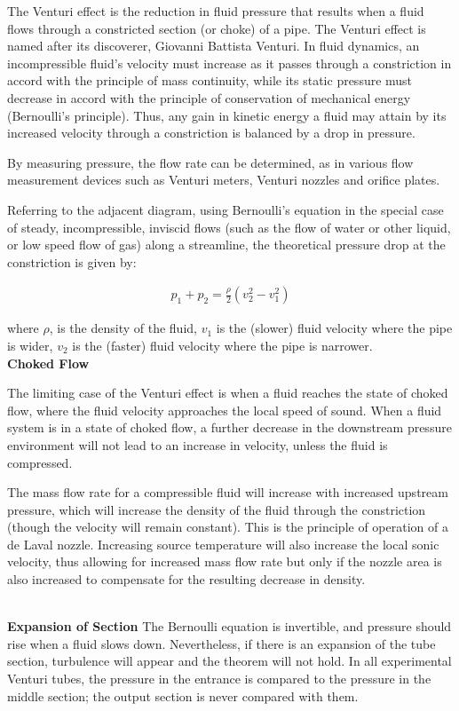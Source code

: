 \begin{phybox}{}
    {The Venturi effect is the reduction in fluid pressure that results when a fluid flows through a constricted section (or choke) of a pipe. The Venturi effect is named after its discoverer, Giovanni Battista Venturi. In fluid dynamics, an incompressible fluid's velocity must increase as it passes through a constriction in accord with the principle of mass continuity, while its static pressure must decrease in accord with the principle of conservation of mechanical energy (Bernoulli's principle). Thus, any gain in kinetic energy a fluid may attain by its increased velocity through a constriction is balanced by a drop in pressure.

    By measuring pressure, the flow rate can be determined, as in various flow measurement devices such as Venturi meters, Venturi nozzles and orifice plates.
    
    Referring to the adjacent diagram, using Bernoulli's equation in the special case of steady, incompressible, inviscid flows (such as the flow of water or other liquid, or low speed flow of gas) along a streamline, the theoretical pressure drop at the constriction is given by:}

    \begin{align*}
        p_1+p_2=\frac{\rho}{2} (v_2^2-v_1^2)  
    \end{align*}

    {where $\rho$, is the density of the fluid, $v_1$ is the (slower) fluid velocity where the pipe is wider, $v_2$ is the (faster) fluid velocity where the pipe is narrower.}
     \\
    \textbf{Choked Flow}
    {The limiting case of the Venturi effect is when a fluid reaches the state of choked flow, where the fluid velocity approaches the local speed of sound. When a fluid system is in a state of choked flow, a further decrease in the downstream pressure environment will not lead to an increase in velocity, unless the fluid is compressed.

    The mass flow rate for a compressible fluid will increase with increased upstream pressure, which will increase the density of the fluid through the constriction (though the velocity will remain constant). This is the principle of operation of a de Laval nozzle. Increasing source temperature will also increase the local sonic velocity, thus allowing for increased mass flow rate but only if the nozzle area is also increased to compensate for the resulting decrease in density.}
    \\
    \textbf{Expansion of Section}
    {The Bernoulli equation is invertible, and pressure should rise when a fluid slows down. Nevertheless, if there is an expansion of the tube section, turbulence will appear and the theorem will not hold. In all experimental Venturi tubes, the pressure in the entrance is compared to the pressure in the middle section; the output section is never compared with them.}
\end{phybox}
